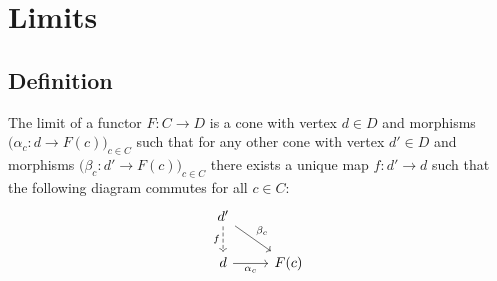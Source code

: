 \section{Limits}

\subsection{Definition}
The limit of a functor $F:C\to D$ is a cone with vertex $d\in D$ and morphisms
$\big(\alpha_c: d \to F(c)\big)_{c\in C}$ such that for any other cone with
vertex $d'\in D$ and morphisms $\big(\beta_c: d' \to F(c)\big)_{c\in C}$ there
exists a unique map $f:d'\to d$ such that the following diagram commutes for all
$c\in C$: \parencite{leinster:basic_category_theory}
\[\begin{tikzcd}
	{d'} \\
	d & {F(c)}
	\arrow["{\alpha_c}"', from=2-1, to=2-2]
	\arrow["{\beta_c}", from=1-1, to=2-2]
	\arrow["f"', dashed, from=1-1, to=2-1]
\end{tikzcd}\]